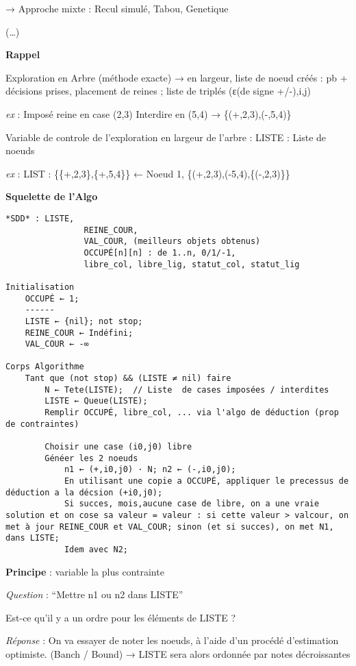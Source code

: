 \documentclass[]{article}
\begin{document}
→ Approche mixte : Recul simulé, Tabou, Genetique

(\ldots{})

\textbf{Rappel}

Exploration en Arbre (méthode exacte) → en largeur, liste de noeud créés
: pb + décisions prises, placement de reines ; liste de triplés (ε(de
signe +/-),i,j)

\emph{ex} : Imposé reine en case (2,3) Interdire en (5,4) →
\{(+,2,3),(-,5,4)\}

Variable de controle de l'exploration en largeur de l'arbre : LISTE :
Liste de noeuds

\emph{ex} : LIST : \{\{+,2,3\},\{+,5,4\}\} ← Noeud 1,
\{(+,2,3),(-5,4),\{(-,2,3)\}\}

\textbf{Squelette de l'Algo}

\begin{verbatim}
*SDD* : LISTE,
                REINE_COUR, 
                VAL_COUR, (meilleurs objets obtenus)
                OCCUPÉ[n][n] : de 1..n, 0/1/-1,
                libre_col, libre_lig, statut_col, statut_lig

Initialisation
    OCCUPÉ ← 1;
    ------
    LISTE ← {nil}; not stop;
    REINE_COUR ← Indéfini;
    VAL_COUR ← -∞

Corps Algorithme
    Tant que (not stop) && (LISTE ≠ nil) faire
        N ← Tete(LISTE);  // Liste  de cases imposées / interdites
        LISTE ← Queue(LISTE);
        Remplir OCCUPÉ, libre_col, ... via l'algo de déduction (prop de contraintes)

        Choisir une case (i0,j0) libre
        Généer les 2 noeuds 
            n1 ← (+,i0,j0) · N; n2 ← (-,i0,j0);
            En utilisant une copie a OCCUPÉ, appliquer le precessus de déduction a la décsion (+i0,j0);
            Si succes, mois,aucune case de libre, on a une vraie solution et on cose sa valeur = valeur : si cette valeur > valcour, on met à jour REINE_COUR et VAL_COUR; sinon (et si succes), on met N1, dans LISTE;
            Idem avec N2;
\end{verbatim}

\textbf{Principe} : variable la plus contrainte

\emph{Question} : ``Mettre n1 ou n2 dans LISTE''

Est-ce qu'il y a un ordre pour les éléments de LISTE ?

\emph{Réponse} : On va essayer de noter les noeuds, à l'aide d'un
procédé d'estimation optimiste. (Banch / Bound) → LISTE sera alors
ordonnée par notes décroissantes
\end{document}
